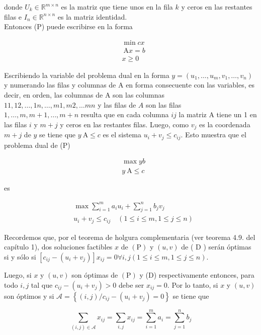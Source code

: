 \documentclass[10pt]{article}
\begin{document}
donde $U_{k} \in \mathbb{R}^{m \times n}$ es la matriz que tiene unos en la fila $k$ y ceros en las restantes filas e $I_{n} \in \mathbb{R}^{n \times n}$ es la matriz identidad.\\
Entonces (P) puede escribirse en la forma

$$
\begin{aligned}
& \min c x \\
& \mathrm{~A} x=b \\
& x \geq 0
\end{aligned}
$$

Escribiendo la variable del problema dual en la forma $y=\left(u_{1}, \ldots, u_{m}, v_{1}, \ldots, v_{n}\right)$ y numerando las filas y columnas de A en forma consecuente con las variables, es decir, en orden, las columnas de A son las columnas $11,12, \ldots, 1 n, \ldots, m 1, m 2, \ldots m n$ y las filas de $A$ son las filas $1, \ldots, m, m+1, \ldots, m+n$ resulta que en cada columna $i j$ la matriz A tiene un 1 en las filas $i$ y $m+j$ y ceros en las restantes filas. Luego, como $v_{j}$ es la coordenada $m+j$ de $y$ se tiene que $y \mathrm{~A} \leq c$ es el sistema $u_{i}+v_{j} \leq c_{i j}$. Esto muestra que el problema dual de (P)

$$
\begin{aligned}
& \max y b \\
& y \mathrm{~A} \leq c
\end{aligned}
$$

es


\begin{align*}
& \max \sum_{i=1}^{m} a_{i} u_{i}+\sum_{j=1}^{n} b_{j} v_{j}  \tag{D}\\
& u_{i}+v_{j} \leq c_{i j} \quad(1 \leq i \leq m, 1 \leq j \leq n)
\end{align*}


Recordemos que, por el teorema de holgura complementaria (ver teorema 4.9. del capítulo 1), dos soluciones factibles $x$ de $(\mathrm{P})$ y $(u, v)$ de ( D ) serán óptimas si y sólo si $\left[c_{i j}-\left(u_{i}+v_{j}\right)\right] x_{i j}=0 \forall i, j(1 \leq i \leq m, 1 \leq j \leq n)$.

Luego, si $x$ y $(u, v)$ son óptimas de $(\mathrm{P})$ y (D) respectivamente entonces, para todo $i, j$ tal que $c_{i j}-\left(u_{i}+v_{j}\right)>0$ debe ser $x_{i j}=0$. Por lo tanto, si $x$ y $(u, v)$ son óptimos y si $\mathcal{A}=\left\{(i, j) / c_{i j}-\left(u_{i}+v_{j}\right)=0\right\}$ se tiene que

$$
\sum_{(i, j) \in \mathcal{A}} x_{i j}=\sum_{i, j} x_{i j}=\sum_{i=1}^{m} a_{i}=\sum_{j=1}^{n} b_{j}
$$
\end{document}
